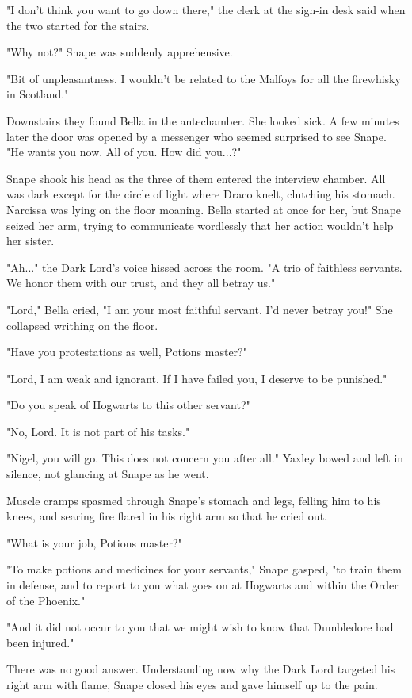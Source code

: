 \documentclass[a4paper,11pt]{article}
\begin{document}
"I don't think you want to go down there," the clerk at the sign-in desk said when the two started for the stairs.

"Why not?" Snape was suddenly apprehensive.

"Bit of unpleasantness. I wouldn't be related to the Malfoys for all the firewhisky in Scotland."

Downstairs they found Bella in the antechamber. She looked sick. A few minutes later the door was opened by a messenger who seemed surprised to see Snape. "He wants you now. All of you. How did you...?"

Snape shook his head as the three of them entered the interview chamber. All was dark except for the circle of light where Draco knelt, clutching his stomach. Narcissa was lying on the floor moaning. Bella started at once for her, but Snape seized her arm, trying to communicate wordlessly that her action wouldn't help her sister.

"Ah..." the Dark Lord's voice hissed across the room. "A trio of faithless servants. We honor them with our trust, and they all betray us."

"Lord," Bella cried, "I am your most faithful servant. I'd never betray you!" She collapsed writhing on the floor.

"Have you protestations as well, Potions master?"

"Lord, I am weak and ignorant. If I have failed you, I deserve to be punished."

"Do you speak of Hogwarts to this other servant?"

"No, Lord. It is not part of his tasks."

"Nigel, you will go. This does not concern you after all." Yaxley bowed and left in silence, not glancing at Snape as he went.

Muscle cramps spasmed through Snape's stomach and legs, felling him to his knees, and searing fire flared in his right arm so that he cried out.

"What is your job, Potions master?"

"To make potions and medicines for your servants," Snape gasped, "to train them in defense, and to report to you what goes on at Hogwarts and within the Order of the Phoenix."

"And it did not occur to you that we might wish to know that Dumbledore had been injured."

There was no good answer. Understanding now why the Dark Lord targeted his right arm with flame, Snape closed his eyes and gave himself up to the pain.
\end{document}
